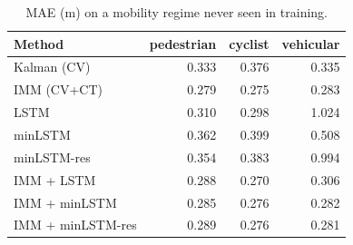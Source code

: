 \begin{table}[t]
\centering
\caption{MAE (m) on a mobility regime never seen in training.}\label{tab:generalisation}
\begin{tabular}{lrrr}
\toprule
Method & pedestrian & cyclist & vehicular \\
\midrule
Kalman (CV) & 0.333 & 0.376 & 0.335 \\
IMM (CV+CT) & 0.279 & 0.275 & 0.283 \\
LSTM & 0.310 & 0.298 & 1.024 \\
minLSTM & 0.362 & 0.399 & 0.508 \\
minLSTM-res & 0.354 & 0.383 & 0.994 \\
IMM + LSTM & 0.288 & 0.270 & 0.306 \\
IMM + minLSTM & 0.285 & 0.276 & 0.282 \\
IMM + minLSTM-res & 0.289 & 0.276 & 0.281 \\
\bottomrule
\end{tabular}
\end{table}
